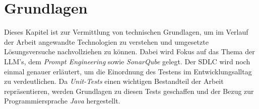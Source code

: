 
\chapter{Grundlagen}\label{chap:basics}
Dieses Kapitel ist zur Vermittlung von technischen Grundlagen, um im Verlauf der Arbeit angewandte Technologien zu verstehen und umgesetzte Lösungsversuche nachvollziehen zu können. Dabei wird Fokus auf das Thema der LLM's, dem \textit{Prompt Engineering} sowie \textit{SonarQube} gelegt. Der SDLC wird noch einmal genauer erläutert, um die Einordnung des Testens im Entwicklungsalltag zu verdeutlichen. Da \textit{Unit-Tests} einen wichtigen Bestandteil der Arbeit repräsentieren, werden Grundlagen zu diesen Tests geschaffen und der Bezug zur Programmiersprache \textit{Java} hergestellt.

